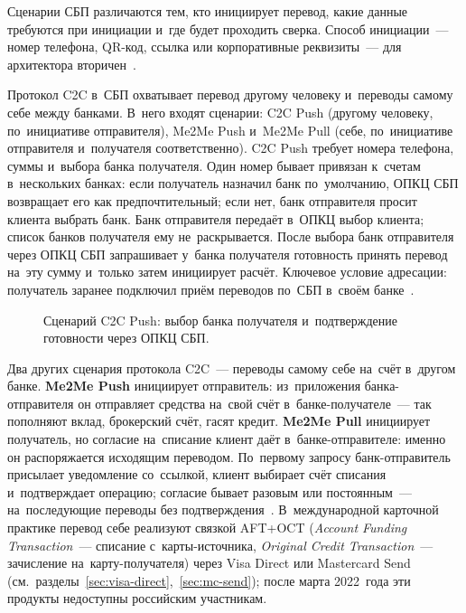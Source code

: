Сценарии СБП различаются тем, кто инициирует перевод, какие данные требуются
при инициации и~где будет проходить сверка. Способ инициации~--- номер телефона,
QR-код, ссылка или корпоративные реквизиты~--- для архитектора
вторичен~\cite{sbp-faq-general}.

Протокол C2C в~СБП охватывает перевод другому человеку и~переводы самому себе
между банками. В~него входят сценарии: C2C Push (другому человеку,
по~инициативе отправителя), Me2Me Push и~Me2Me Pull (себе, по~инициативе
отправителя и~получателя соответственно). C2C Push требует номера телефона,
суммы и~выбора банка получателя. Один номер бывает привязан к~счетам
в~нескольких банках: если получатель назначил банк по~умолчанию, ОПКЦ СБП
возвращает его как предпочтительный; если нет, банк отправителя просит клиента
выбрать банк. Банк отправителя передаёт в~ОПКЦ выбор клиента; список банков
получателя ему не~раскрывается. После выбора банк отправителя через ОПКЦ СБП
запрашивает у~банка получателя готовность принять перевод на~эту сумму и~только
затем инициирует расчёт. Ключевое условие адресации: получатель заранее
подключил приём переводов по~СБП в~своём банке~\cite{sbp-faq-transfers}.

\begin{figure}[tbp]
  \centering
  \caption{Сценарий C2C Push: выбор банка получателя и~подтверждение
  готовности через ОПКЦ СБП.}\label{fig:sbp-c2c-flow}
\end{figure}

Два других сценария протокола C2C~--- переводы самому себе на~счёт в~другом
банке. \textbf{Me2Me Push} инициирует отправитель: из~приложения
банка-отправителя он отправляет средства на~свой счёт в~банке-получателе~--- так
пополняют вклад, брокерский счёт, гасят кредит. \textbf{Me2Me Pull} инициирует
получатель, но согласие на~списание клиент даёт в~банке-отправителе: именно он
распоряжается исходящим переводом. По~первому запросу банк-отправитель присылает
уведомление со~ссылкой, клиент выбирает счёт списания и~подтверждает операцию;
согласие бывает разовым или постоянным~--- на~последующие переводы без
подтверждения~\cite{moneta-sbp-me2me-pull}. В~международной карточной практике перевод
себе реализуют связкой AFT+OCT (\textit{Account Funding Transaction}~--- списание
  с~карты-источника, \textit{Original Credit Transaction}~--- зачисление
на~карту-получателя) через Visa Direct или Mastercard Send
(см.~разделы~\ref{sec:visa-direct},~\ref{sec:mc-send}); после марта
2022~года эти продукты недоступны российским участникам.


